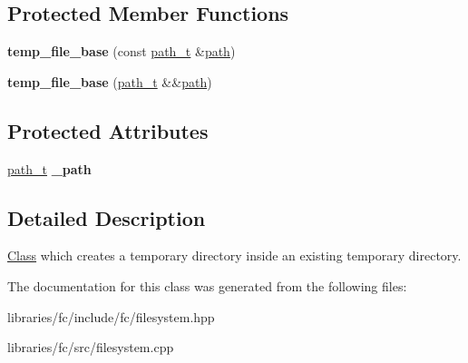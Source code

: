 \subsection*{Protected Member Functions}
\begin{DoxyCompactItemize}
\item 
\mbox{\label{classfc_1_1temp__file__base_ac2787d85b196125fe5de7f22cb3a5dd1}} 
{\bfseries temp\+\_\+file\+\_\+base} (const \mbox{\hyperlink{classfc_1_1optional}{path\+\_\+t}} \&\mbox{\hyperlink{classfc_1_1path}{path}})
\item 
\mbox{\label{classfc_1_1temp__file__base_a2b5342fec6fb8fcc4042c353378805d8}} 
{\bfseries temp\+\_\+file\+\_\+base} (\mbox{\hyperlink{classfc_1_1optional}{path\+\_\+t}} \&\&\mbox{\hyperlink{classfc_1_1path}{path}})
\end{DoxyCompactItemize}
\subsection*{Protected Attributes}
\begin{DoxyCompactItemize}
\item 
\mbox{\label{classfc_1_1temp__file__base_a69e1eb6507b6d0a7fef8280235cbe0bd}} 
\mbox{\hyperlink{classfc_1_1optional}{path\+\_\+t}} {\bfseries \+\_\+path}
\end{DoxyCompactItemize}


\subsection{Detailed Description}
\mbox{\hyperlink{class_class}{Class}} which creates a temporary directory inside an existing temporary directory. 

The documentation for this class was generated from the following files\+:\begin{DoxyCompactItemize}
\item 
libraries/fc/include/fc/filesystem.\+hpp\item 
libraries/fc/src/filesystem.\+cpp\end{DoxyCompactItemize}
